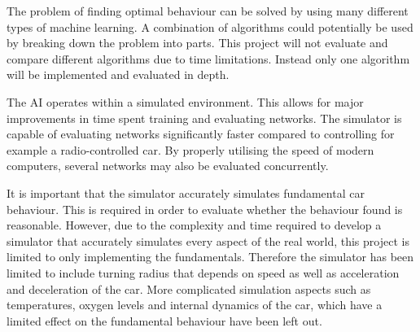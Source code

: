 The problem of finding optimal behaviour can be solved by using many different types of machine learning. A combination of algorithms could potentially be used by breaking down the problem into parts. This project will not evaluate and compare different algorithms due to time limitations. Instead only one algorithm will be implemented and evaluated in depth.


The AI operates within a simulated environment. This allows for major improvements in time spent training and evaluating networks. The simulator is capable of evaluating networks significantly faster compared to controlling for example a radio-controlled car. By properly utilising the speed of modern computers, several networks may also be evaluated concurrently. 

It is important that the simulator accurately simulates fundamental car behaviour. This is required in order to evaluate whether the behaviour found is reasonable. However, due to the complexity and time required to develop a simulator that accurately simulates every aspect of the real world, this project is limited to only implementing the fundamentals. Therefore the simulator has been limited to include turning radius that depends on speed as well as acceleration and deceleration of the car. More complicated simulation aspects such as temperatures, oxygen levels and internal dynamics of the car, which have a limited effect on the fundamental behaviour have been left out.



